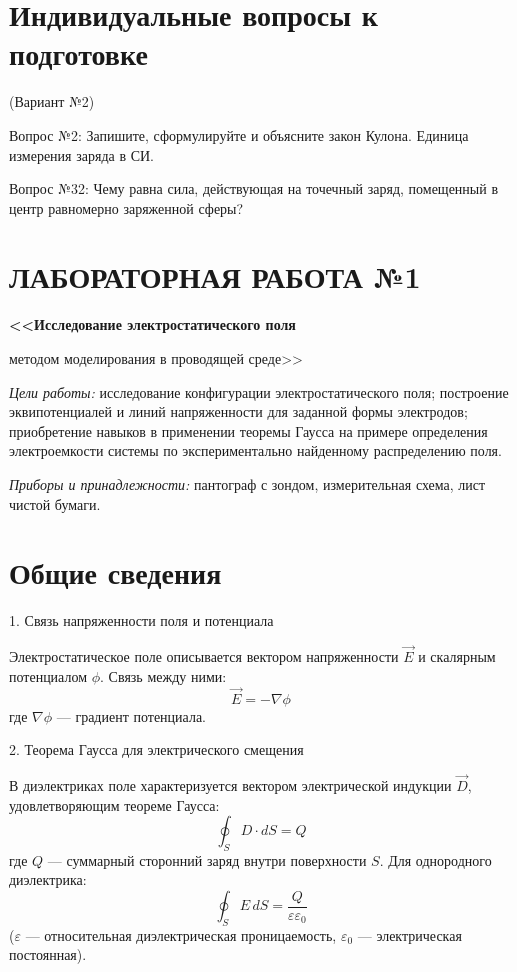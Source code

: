 \documentclass[14pt,a4paper]{extarticle}
\begin{document}


\section*{Индивидуальные вопросы к подготовке}
(Вариант №2)

Вопрос №2: Запишите, сформулируйте и объясните
закон Кулона. Единица измерения заряда в СИ.

Вопрос №32: Чему равна сила, действующая
на точечный заряд, помещенный в центр равномерно
заряженной сферы?

\newpage

\section*{ЛАБОРАТОРНАЯ РАБОТА №1}
\begin{center}
    \bfseries
    <<Исследование электростатического поля\par
    методом моделирования в проводящей среде>>
\end{center}

\textit{Цели работы:} исследование конфигурации
электростатического поля; построение эквипотенциалей
и линий напряженности для заданной формы электродов;
приобретение навыков в применении теоремы Гаусса на
примере определения электроемкости системы по
экспериментально найденному распределению поля.

\textit{Приборы и принадлежности:} пантограф с
зондом, измерительная схема, лист чистой бумаги.

\section*{Общие сведения}


1. Связь напряженности поля и потенциала

Электростатическое поле описывается вектором напряженности $\vec{E}$ и скалярным потенциалом $\phi$. Связь между ними:  
$$
\vec{E} = -\nabla \phi
$$
где $\nabla \phi$ — градиент потенциала.

2. Теорема Гаусса для электрического смещения  

В диэлектриках поле характеризуется вектором электрической индукции $\vec{D}$, удовлетворяющим теореме Гаусса:  
$$
\oint_S D \cdot dS = Q
$$  
где $Q$ — суммарный сторонний заряд внутри поверхности $S$. Для однородного диэлектрика:  
$$
\oint_S E \, dS = \frac{Q}{\varepsilon \varepsilon_0}
$$  
($\varepsilon$ — относительная диэлектрическая проницаемость, $\varepsilon_0$ — электрическая постоянная).
\end{document}

